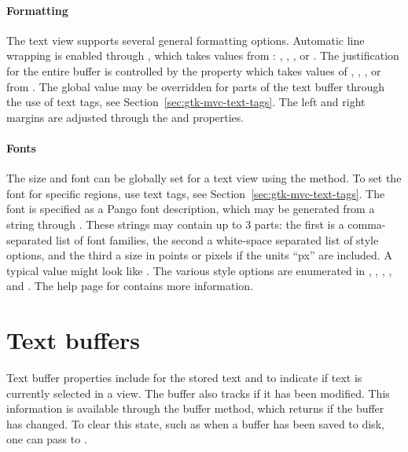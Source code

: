 \paragraph{Formatting}
The text view supports several general formatting options. Automatic
line wrapping is enabled through ,
which takes values from : ,
, , or . The justification
for the entire buffer is controlled by the 
property which takes values of , ,
, or  from .  The
global value may be overridden for parts of the text buffer through
the use of text tags, see Section~\ref{sec:gtk-mvc-text-tags}. The
left and right margins are adjusted through the  and
 properties.

\paragraph{Fonts}
The size and font can be globally set for a text view using the
 method. To set the font for specific
regions, use text tags, see Section~\ref{sec:gtk-mvc-text-tags}. The
font is specified as a Pango font description, which may be generated
from a string through . These
strings may contain up to 3 parts: the first is a comma-separated list
of font families, the second a white-space separated list of style
options, and the third a size in points or pixels if the units ``px''
are included. A typical value might look like . The various style options are enumerated
in , , ,
, and . The help page for
 contains more information.


\section{Text buffers}
\label{sec:RGtk2:text-buffers}

Text buffer properties include  for the stored text and
 to indicate if text is currently selected in a
view. The buffer also tracks if it has been modified. This information
is available through the buffer 
method, which returns  if the buffer has changed. To clear
this state, such as when a buffer has been saved to disk, one can pass
 to .

